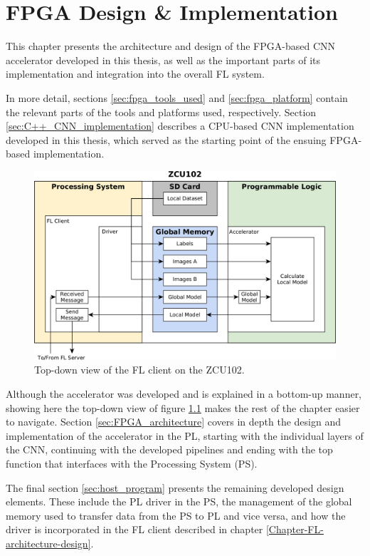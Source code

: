 \chapter{FPGA Design \& Implementation} 
\label{Chapter-FPGA-Implementation}
This chapter presents the architecture and design of the FPGA-based CNN accelerator developed in this thesis, as well as the important parts of its implementation and integration into the overall FL system.

In more detail, sections \ref{sec:fpga_tools_used} and \ref{sec:fpga_platform} contain the relevant parts of the tools and platforms used, respectively. Section \ref{sec:C++_CNN_implementation} describes a CPU-based CNN implementation developed in this thesis, which served as the starting point of the ensuing FPGA-based implementation.

\begin{figure}[H]
    \centering
        \includegraphics[width=\textwidth]{Images/block_diagrams/zcu_FL_client.png}
        \decoRule
        \caption[ZCU102 FL client]{Top-down view of the FL client on the ZCU102.}
        \label{fig: ZCU102 FL client}
\end{figure}

Although the accelerator was developed and is explained in a bottom-up manner, showing here the top-down view of figure \ref{fig: ZCU102 FL client} makes the rest of the chapter easier to navigate. Section \ref{sec:FPGA_architecture} covers in depth the design and implementation of the accelerator in the PL, starting with the individual layers of the CNN, continuing with the developed pipelines and ending with the top function that interfaces with the Processing System (PS).

The final section \ref{sec:host_program} presents the remaining developed design elements. These include the PL driver in the PS, the management of the global memory used to transfer data from the PS to PL and vice versa, and how the driver is incorporated in the FL client described in chapter \ref{Chapter-FL-architecture-design}.


